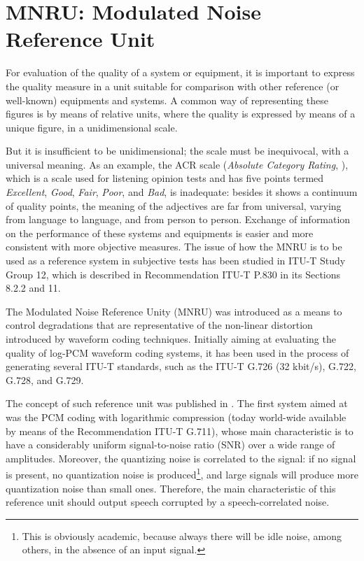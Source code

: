 \chapter{MNRU: Modulated Noise Reference Unit}

For evaluation of the quality of a system or equipment, it is important to express the quality measure in a unit
suitable for comparison with other reference (or well-known) equipments and systems.
A common way of representing these figures is by means of relative units, where the quality is expressed by means of a
unique figure, in a unidimensional scale.

But it is insufficient to be unidimensional; the scale must be inequivocal, with a universal meaning.
As an example, the ACR scale ({\em Absolute Category Rating}, \cite[Annex B]{P.800}), which is a scale used for
listening opinion tests and has five points termed {\em Excellent}, {\em Good}, {\em Fair}, {\em Poor}, and {\em Bad},
is inadequate: besides it shows a continuum of quality points, the meaning of the adjectives are far from universal,
varying from language to language, and from person to person.
Exchange of information on the performance of these systems and equipments is easier and more consistent with more
objective measures.
The issue of how the MNRU is to be used as a reference system in subjective tests has been studied in ITU-T Study Group
12, which is described in Recommendation ITU-T P.830 \cite{P.830} in its Sections 8.2.2 and 11.

The Modulated Noise Reference Unity (MNRU) was introduced as a means to control degradations that are representative
of the non-linear distortion introduced by waveform coding techniques.
Initially aiming at evaluating the quality of log-PCM waveform coding systems, it has been used in the process of
generating several ITU-T standards, such as the ITU-T G.726 (32 kbit/s), G.722, G.728, and G.729.

The concept of such reference unit was published in \cite{Q001.02.04.02}.
The first system aimed at was the PCM coding with logarithmic compression (today world-wide available by means of the
Recommendation ITU-T G.711), whose main characteristic is to have a considerably uniform signal-to-noise ratio (SNR)
over a wide range of amplitudes.
Moreover, the quantizing noise is correlated to the signal: if no signal is present, no quantization noise is
produced\footnote{\SF This is obviously academic, because always there will be idle noise, among others, in the absence
of an input signal.}, and large signals will produce more quantization noise than small ones.
Therefore, the main characteristic of this reference unit should output speech corrupted by a speech-correlated noise.

